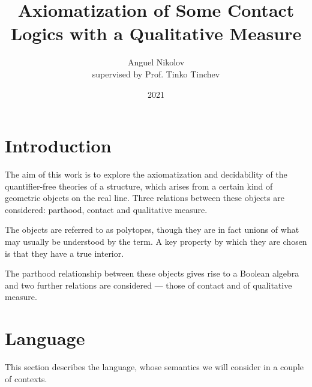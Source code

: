 \documentclass{article}
\title{Axiomatization of Some Contact Logics with a Qualitative Measure}
\author{Anguel Nikolov\\{\small supervised by Prof. Tinko Tinchev}}
\affil{Faculty of Mathematics and Informatics \\
  Sofia University ``St. Kliment Ohridski''}
\date{2021}
\begin{document}
\maketitle

\tableofcontents

\section{Introduction}

The aim of this work is to explore the axiomatization and decidability of the quantifier-free theories of a structure, which arises from a certain kind of geometric objects on the real line. Three relations between these objects are considered: parthood, contact and qualitative measure.

The objects are referred to as polytopes, though they are in fact unions of what may usually be understood by the term. A key property by which they are chosen is that they have a true interior.

The parthood relationship between these objects gives rise to a Boolean algebra and two further relations are considered --- those of contact and of qualitative measure.

\section{Language}
This section describes the language, whose semantics we will consider in a couple of contexts.
\end{document}
